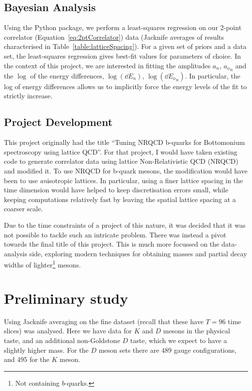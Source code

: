 \documentclass[a4paper,12pt]{article}
\begin{document}
\subsection{Bayesian Analysis}
Using the \cite{lepage2020corrfitter} Python package, we perform a least-squares regression on our 2-point correlator (Equation~\ref{eq:2ptCorrelator}) data (Jacknife averages of results characterised in Table~\ref{table:latticeSpacing}). For a given set of priors and a data set, the least-squares regression gives best-fit values for parameters of choice. In the context of this project, we are interested in fitting the amplitudes $a_n$, ${a_o}_n$ and the $\log$ of the energy differences, $\log(\dd E_n)$, $\log({\dd E_o}_n)$. In particular, the log of energy differences allows us to implicitly force the energy levels of the fit to strictly increase.

\subsection{Project Development}
This project originally had the title ``Tuning NRQCD b-quarks for Bottomonium spectroscopy using lattice QCD''. For that project, I would have taken existing code to generate correlator data using lattice Non-Relativistic QCD (NRQCD) and modified it. To use NRQCD for b-quark mesons, the modification would have been to use \emph{an}isotropic lattices. In particular, using a finer lattice spacing in the time dimension would have helped to keep discretisation errors small, while keeping computations relatively fast by leaving the spatial lattice spacing at a coarser scale.

Due to the time constraints of a project of this nature, it was decided that it was not possible to tackle such an intricate problem. There was instead a pivot towards the final title of this project. This is much more focussed on the data-analysis side, exploring modern techniques for obtaining masses and partial decay widths of lighter\footnote{Not containing $b$-quarks.} mesons.

\section{Preliminary study}

Using Jacknife averaging on the fine dataset (recall that these have $T=96$ time slices) was analysed. Here we have data for $K$ and $D$ mesons in the physical taste, and an additional non-Goldstone $D$ taste, which we expect to have a slightly higher mass. For the $D$ meson sets there are 489 gauge configurations, and 495 for the $K$ meson. 
\end{document}
